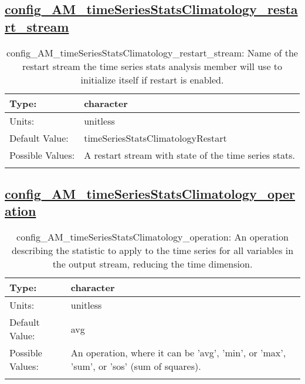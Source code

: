 \subsection[config\_AM\_timeSeriesStatsClimatology\_restart\_stream]{\hyperref[sec:nm_tab_AM_timeSeriesStatsClimatology]{config\_AM\_timeSeriesStatsClimatology\_restart\_stream}}
\label{subsec:nm_sec_config_AM_timeSeriesStatsClimatology_restart_stream}
\begin{center}
\begin{longtable}{| p{2.0in} || p{4.0in} |}
    \hline
    Type: & character \\
    \hline
    Units: & \si{unitless} \\
    \hline
    Default Value: & timeSeriesStatsClimatologyRestart \\
    \hline
    Possible Values: & A restart stream with state of the time series stats. \\
    \hline
    \caption{config\_AM\_timeSeriesStatsClimatology\_restart\_stream: Name of the restart stream the time series stats analysis member will use to initialize itself if restart is enabled.}
\end{longtable}
\end{center}
\subsection[config\_AM\_timeSeriesStatsClimatology\_operation]{\hyperref[sec:nm_tab_AM_timeSeriesStatsClimatology]{config\_AM\_timeSeriesStatsClimatology\_operation}}
\label{subsec:nm_sec_config_AM_timeSeriesStatsClimatology_operation}
\begin{center}
\begin{longtable}{| p{2.0in} || p{4.0in} |}
    \hline
    Type: & character \\
    \hline
    Units: & \si{unitless} \\
    \hline
    Default Value: & avg \\
    \hline
    Possible Values: & An operation, where it can be 'avg', 'min', or 'max', 'sum', or 'sos' (sum of squares). \\
    \hline
    \caption{config\_AM\_timeSeriesStatsClimatology\_operation: An operation describing the statistic to apply to the time series for all variables in the output stream, reducing the time dimension.}
\end{longtable}
\end{center}
